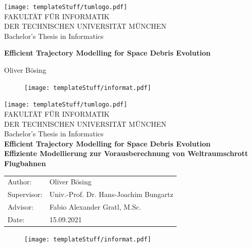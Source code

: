 \documentclass[11pt,
               a4paper,
               bibtotoc,
               idxtotoc,
               headsepline,
               footsepline,
               footexclude,
               BCOR12mm,
               DIV13,
               openany,   %
               ]
               {scrbook}
\def\doctype{Bachelor's Thesis\xspace}
\def\studyProgram{Informatics}
\def\title{Efficient Trajectory Modelling for Space Debris Evolution}
\def\titleGer{Effiziente Modellierung zur Vorausberechnung von Weltraumschrott Flugbahnen}
\def\author{Oliver Bösing}
\def\supervisor{Univ.-Prof. Dr. Hans-Joachim Bungartz}
\def\advisor{Fabio Alexander Gratl, M.Sc.}
\def\date{15.09.2021}
\begin{document}
\frontmatter

\def\bcorcor{0.15cm}
\addtolength{\hoffset}{\bcorcor}
\thispagestyle{empty}
\vspace{4cm}
\begin{center}
    \texttt{[image: templateStuff/tumlogo.pdf]}\\[5mm]
    \huge FAKULTÄT FÜR INFORMATIK\\[5mm]
    \large DER TECHNISCHEN UNIVERSITÄT MÜNCHEN\\[24mm]

    {\Large \doctype in \studyProgram}\\[20mm]
    {\huge\bf \title\par}
    \vspace{15mm}
    {\LARGE  \author}
    \vspace{10mm}
    \begin{figure}[h!]
        \centering
        \texttt{[image: templateStuff/informat.pdf]}
   \end{figure}
\end{center}

\cleardoubleemptypage


\def\bcorcor{0.15cm}
\addtolength{\hoffset}{\bcorcor}
\thispagestyle{empty}
\vspace{10mm}
\begin{center}
    \texttt{[image: templateStuff/tumlogo.pdf]}\\[5mm]
	\huge FAKULTÄT FÜR INFORMATIK\\[5mm]
	\large DER TECHNISCHEN UNIVERSITÄT MÜNCHEN\\[24mm]
	{\Large \doctype in \studyProgram}\\[20mm]
	{\LARGE\bf \title}\\[10mm]
	{\LARGE\bf \titleGer}\\[10mm]
	\begin{tabular}{ll}
		\Large Author:      	& \Large \author \\[2mm]
		\Large Supervisor:  	& \Large \supervisor\\[2mm]
		\Large Advisor:			& \Large \advisor\\[2mm]
		\Large Date:       		& \Large \date
	\end{tabular}
	\vspace{-1mm}
	\begin{figure}[h!]
		\centering
		\texttt{[image: templateStuff/informat.pdf]}
	\end{figure}
\end{center}
\end{document}
